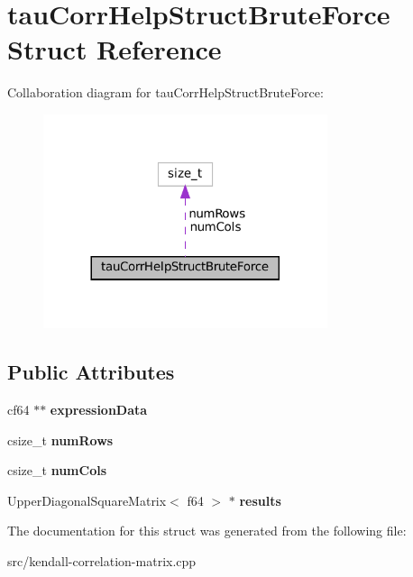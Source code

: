 \hypertarget{structtauCorrHelpStructBruteForce}{}\section{tau\+Corr\+Help\+Struct\+Brute\+Force Struct Reference}
\label{structtauCorrHelpStructBruteForce}


Collaboration diagram for tau\+Corr\+Help\+Struct\+Brute\+Force\+:\nopagebreak
\begin{figure}[H]
\begin{center}
\leavevmode
\includegraphics[width=236pt]{structtauCorrHelpStructBruteForce__coll__graph}
\end{center}
\end{figure}
\subsection*{Public Attributes}
\begin{DoxyCompactItemize}
\item 
\mbox{\label{structtauCorrHelpStructBruteForce_abf5bf9e13f8fbaa9c51ac90519f58a66}} 
cf64 $\ast$$\ast$ {\bfseries expression\+Data}
\item 
\mbox{\label{structtauCorrHelpStructBruteForce_aa761378aea37859cf7d7c61e8a077eba}} 
csize\+\_\+t {\bfseries num\+Rows}
\item 
\mbox{\label{structtauCorrHelpStructBruteForce_abf804c94286f5cbd7a5eb5a9a1710abf}} 
csize\+\_\+t {\bfseries num\+Cols}
\item 
\mbox{\label{structtauCorrHelpStructBruteForce_ab2f1c28e7b57ae7c99cc4e9261bb8423}} 
Upper\+Diagonal\+Square\+Matrix$<$ f64 $>$ $\ast$ {\bfseries results}
\end{DoxyCompactItemize}


The documentation for this struct was generated from the following file\+:\begin{DoxyCompactItemize}
\item 
src/kendall-\/correlation-\/matrix.\+cpp\end{DoxyCompactItemize}
